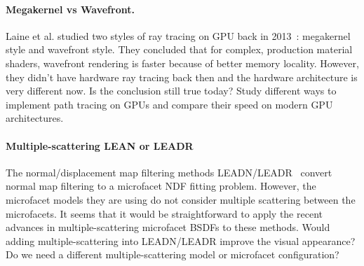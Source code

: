 \paragraph{Megakernel vs Wavefront.}
Laine et al. studied two styles of ray tracing on GPU back in 2013~\cite{Laine:2013:MCH}: megakernel style and wavefront style. They concluded that for complex, production material shaders, wavefront rendering is faster because of better memory locality. However, they didn't have hardware ray tracing back then and the hardware architecture is very different now. Is the conclusion still true today? Study different ways to implement path tracing on GPUs and compare their speed on modern GPU architectures.

\paragraph{Multiple-scattering LEAN or LEADR}
The normal/displacement map filtering methods LEADN/LEADR~\cite{Olano:2010:LM,Dupuy:2013:LEA} convert normal map filtering to a microfacet NDF fitting problem. However, the microfacet models they are using do not consider multiple scattering between the microfacets. It seems that it would be straightforward to apply the recent advances in multiple-scattering microfacet BSDFs to these methods. Would adding multiple-scattering into LEADN/LEADR improve the visual appearance? Do we need a different multiple-scattering model or microfacet configuration?





